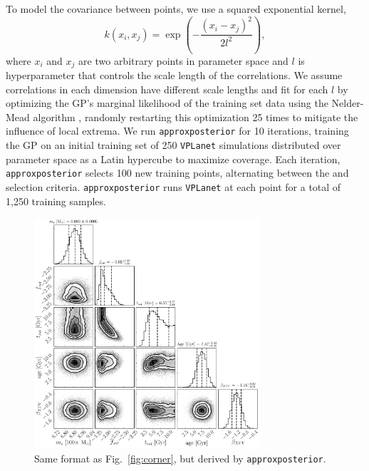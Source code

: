 \documentclass[twocolumn]{aastex62}
\newcommand{\vplanet}[0]{\texttt{VPLanet}\xspace}
\newcommand{\approxposterior}[0]{\texttt{approxposterior}\xspace}
\begin{document}
To model the covariance between points, we use a squared exponential kernel,
\begin{equation} \label{eqn:kernel}
k(x_i, x_j) = \exp \left( - \frac{(x_i - x_j)^2}{2l^2} \right),
\end{equation}
where $x_i$ and $x_j$ are two arbitrary points in parameter space and $l$ is hyperparameter that controls the scale length of the correlations. We assume correlations in each dimension have different scale lengths and fit for each $l$ by optimizing the GP's marginal likelihood of the training set data using the Nelder-Mead algorithm \citep{Nelder1965}, randomly restarting this optimization 25 times to mitigate the influence of local extrema. We run \approxposterior for 10 iterations, training the GP on an initial training set of 250 \vplanet simulations distributed over parameter space as a Latin hypercube to maximize coverage. Each iteration, \approxposterior selects 100 new training points, alternating between the \citet{Kandasamy2015} and \citet{Wang2017} selection criteria. \approxposterior runs \vplanet at each point for a total of 1,250 training samples. 

\begin{figure}[t]
\centering
	\includegraphics[width=0.75\textwidth]{../Analysis/Approx/apCorner.pdf}
   \caption{Same format as Fig.~\ref{fig:corner}, but derived by \approxposterior.}%
    \label{fig:approx}%
\end{figure}
\end{document}
